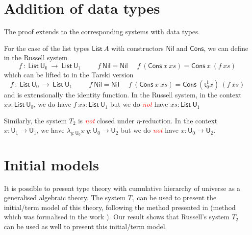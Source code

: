 \documentclass[11pt,a4paper]{article}
\theoremstyle{definition}
\def\UU{\mathsf{U}}
\def\List{\mathsf{List}}
\def\Cons{\mathsf{Cons}}
\def\Nil{\mathsf{Nil}}
\newcommand{\sT}{\mathsf{t}}
\newcommand{\EMP}[1]{\emph{\textcolor{red}{#1}}}
\begin{document}
\section{Addition of data types}

The proof extends to the corresponding systems with data types.

For the case of the list types $\List~A$ with constructors $\Nil$ and $\Cons$, we can define in the Russell system
$$
f~:~\List~\UU_0~\rightarrow~\List~\UU_1~~~~~~~~~~~
f~\Nil = \Nil~~~~~~f~(\Cons~x~xs) = \Cons~x~(f~xs)
$$
which can be lifted to in the Tarski version
$$
f~:~\List~\UU_0~\rightarrow~\List~\UU_1~~~~~~~~~~~
f~\Nil = \Nil~~~~~~f~(\Cons~x~xs) = \Cons~(\sT_0^1 x)~(f~xs)
$$
and is extensionally the identity function.
In the Russell system, in the context  $xs:\List~\UU_0$,
we do have $f~xs:\List~\UU_1$ but we do \EMP{not} have $xs:\List~\UU_1$

\medskip

     Similarly, the system $T_2$ is \EMP{not} closed under $\eta$-reduction. In the context
     $x:\UU_1\rightarrow\UU_1$, 
     we have $\lambda_{y:\UU_0}x~y:\UU_0\rightarrow\UU_2$ but we do \EMP{not} have
     $x:\UU_0\rightarrow\UU_2$.




\section{Initial models}

It is possible to present type theory with cumulative hierarchy of universe as a generalised algebraic theory.
The system $T_1$ can be used to present the initial/term model of this theory, following the method presented in \cite{Streicher:semtt}
(method which was formalised in the work \cite{brunerie:initiality}).
Our result shows that Russell's system $T_2$ can be used as well to present this initial/term model.





\end{document}
